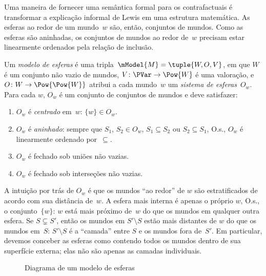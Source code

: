 \documentclass[../../../include/open-logic-section]{subfiles}
\begin{document}


Uma maneira de fornecer uma semântica formal para os contrafactuais é transformar
a explicação informal de Lewis em uma estrutura matemática. As esferas
ao redor de um mundo~$w$ são, então, conjuntos de mundos. Como as esferas são
aninhadas, os conjuntos de mundos ao redor de~$w$ precisam estar linearmente ordenados pela
relação de inclusão.

\begin{defn}
  Um \emph{modelo de esferas} é uma tripla~$\mModel{M} = \tuple{W, O, V}$,
  em que $W$ é um conjunto não vazio de mundos, $V\colon \PVar \to \Pow{W}$
  é uma valoração, e $O\colon W \to \Pow{\Pow{W}}$ atribui a cada
  mundo~$w$ um \emph{sistema de esferas}~$O_w$. Para cada $w$, $O_w$ é um
  conjunto de conjuntos de mundos e deve satisfazer:
  \begin{enumerate}
  \item $O_w$ é \emph{centrado} em~$w$: $\{w\} \in O_w$.
  \item $O_w$ é \emph{aninhado}: sempre que $S_1$, $S_2 \in O_w$, $S_1
    \subseteq S_2$ ou $S_2 \subseteq S_1$, O.s.\@, $O_w$ é linearmente
    ordenado por~$\subseteq$.
  \item $O_w$ é fechado sob uniões não vazias.
  \item $O_w$ é fechado sob interseções não vazias.
  \end{enumerate}
\end{defn}

A intuição por trás de $O_w$ é que os mundos ``ao redor'' de $w$ são
estratificados de acordo com sua distância de~$w$. A esfera mais interna
é apenas o próprio $w$, O.s.\@, o conjunto~$\{w\}$: $w$ está mais próximo
de~$w$ do que os mundos em qualquer outra esfera. Se $S \subsetneq S'$, então
os mundos em $S' \setminus S$ estão mais distantes de $w$ do que os
mundos em~$S$: $S' \setminus S$ é a ``camada'' entre $S$ e
os mundos fora de~$S'$. Em particular, devemos conceber as
esferas como contendo todos os mundos dentro de sua superfície externa;
elas não são apenas as camadas individuais.

\begin{figure}
\begin{center}
\caption{Diagrama de um modelo de esferas}
\end{center}
\end{figure}
\end{document}
